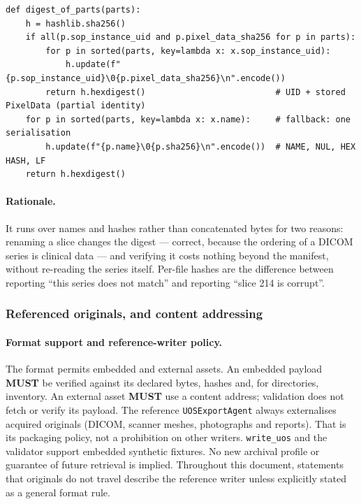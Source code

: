 \documentclass[11pt,a4paper]{article}
\newcommand{\MUST}{\textcolor{uosred}{\textbf{MUST}}}
\newcommand{\code}[1]{\texttt{\small #1}}
\begin{document}
\begin{lstlisting}[style=py]
def digest_of_parts(parts):
    h = hashlib.sha256()
    if all(p.sop_instance_uid and p.pixel_data_sha256 for p in parts):
        for p in sorted(parts, key=lambda x: x.sop_instance_uid):
            h.update(f"{p.sop_instance_uid}\0{p.pixel_data_sha256}\n".encode())
        return h.hexdigest()                          # UID + stored PixelData (partial identity)
    for p in sorted(parts, key=lambda x: x.name):     # fallback: one serialisation
        h.update(f"{p.name}\0{p.sha256}\n".encode())  # NAME, NUL, HEX HASH, LF
    return h.hexdigest()
\end{lstlisting}

\paragraph{Rationale.} It runs over names and hashes rather than concatenated bytes for
two reasons: renaming a slice changes the digest --- correct, because the ordering of a
DICOM series is clinical data --- and verifying it costs nothing beyond the manifest,
without re-reading the series itself. Per-file hashes are the difference between reporting
``this series does not match'' and reporting ``slice 214 is corrupt''.

\subsubsection{Referenced originals, and content addressing}\label{sec:external}

\paragraph{Format support and reference-writer policy.}
The format permits embedded and external assets. An embedded payload \MUST{} be
verified against its declared bytes, hashes and, for directories, inventory. An external
asset \MUST{} use a content address; validation does not fetch or verify its payload.
The reference \code{UOSExportAgent} always externalises acquired originals (DICOM, scanner
meshes, photographs and reports). That is its packaging policy, not a prohibition on other
writers. \code{write\_uos} and the validator support embedded synthetic fixtures. No new
archival profile or guarantee of future retrieval is implied. Throughout this document,
statements that originals do not travel describe the reference writer unless explicitly
stated as a general format rule.
\end{document}
